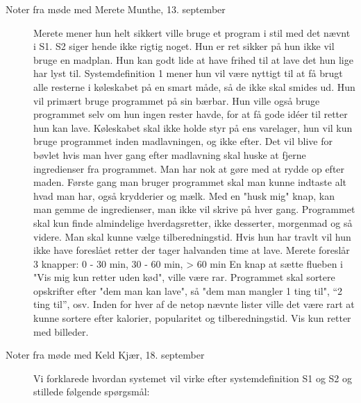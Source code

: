 \begin{description}
\item[Noter fra møde med Merete Munthe, 13. september]
Merete mener hun helt sikkert ville bruge et program i stil med det nævnt i S1. S2 siger hende ikke rigtig noget. Hun er ret sikker på hun ikke vil bruge en madplan. Hun kan godt lide at have frihed til at lave det hun lige har lyst til. Systemdefinition 1 mener hun vil være nyttigt til at få brugt alle resterne i køleskabet på en smart måde, så de ikke skal smides ud. Hun vil primært bruge programmet på sin bærbar.
Hun ville også bruge programmet selv om hun ingen rester havde, for at få gode idéer til retter hun kan lave.
Køleskabet skal ikke holde styr på ens varelager, hun vil kun bruge programmet inden madlavningen, og ikke efter. Det vil blive for bøvlet hvis man hver gang efter madlavning skal huske at fjerne ingredienser fra programmet. Man har nok at gøre med at rydde op efter maden.
Første gang man bruger programmet skal man kunne indtaste alt hvad man har, også krydderier og mælk. Med en "husk mig" knap, kan man gemme de ingredienser, man ikke vil skrive på hver gang.
Programmet skal kun finde almindelige hverdagsretter, ikke desserter, morgenmad og så videre.
Man skal kunne vælge tilberedningstid. Hvis hun har travlt vil hun ikke have foreslået retter der tager halvanden time at lave. Merete foreslår 3 knapper: 0 - 30 min, 30 - 60 min, > 60 min
En knap at sætte flueben i "Vis mig kun retter uden kød", ville være rar.
Programmet skal sortere opskrifter efter "dem man kan lave", så "dem man mangler 1 ting til", “2 ting til”, osv.
Inden for hver af de netop nævnte lister ville det være rart at kunne sortere efter kalorier, popularitet og tilberedningstid.
Vis kun retter med billeder.

\item[Noter fra møde med Keld Kjær, 18. september]
Vi forklarede hvordan systemet vil virke efter systemdefinition S1 og S2 og stillede følgende spørgsmål:


\end{description}
